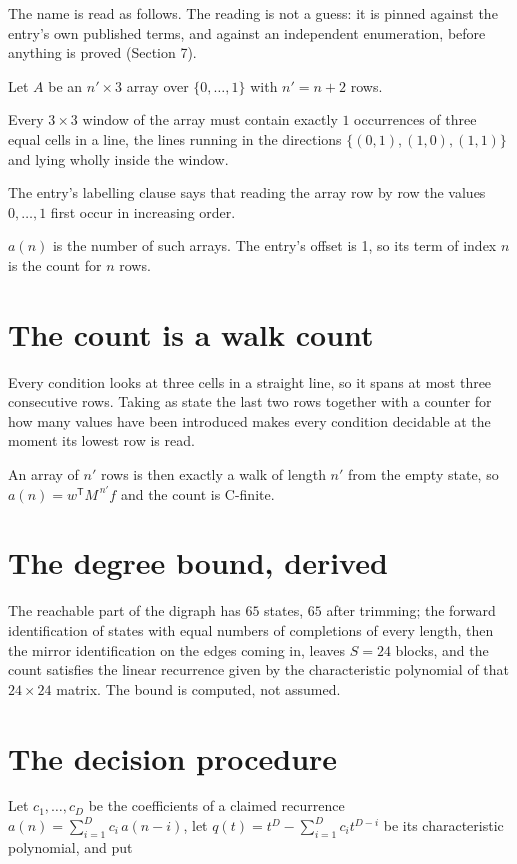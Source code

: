 \documentclass[11pt]{article}
\theoremstyle{definition}
\begin{document}
The name is read as follows. The reading is not a guess: it is pinned against the entry's own published terms, and against an independent enumeration, before anything is proved (Section 7).

Let $A$ be an $n' \times 3$ array over $\{0,\dots,1\}$ with $n' = n + 2$ rows.

Every $3\times3$ window of the array must contain exactly $1$ occurrences of three equal cells in a line, the lines running in the directions $\{(0,1), (1,0), (1,1)\}$ and lying wholly inside the window.

The entry's labelling clause says that reading the array row by row the values $0,\dots,1$ first occur in increasing order.

$a(n)$ is the number of such arrays. The entry's offset is 1, so its term of index $n$ is the count for $n$ rows.

\section{The count is a walk count}

Every condition looks at three cells in a straight line, so it spans at most three consecutive rows. Taking as state the last two rows together with a counter for how many values have been introduced makes every condition decidable at the moment its lowest row is read.

An array of $n'$ rows is then exactly a walk of length $n'$ from the empty state, so $a(n) = w^{\mathsf T}M^{\,n'}f$ and the count is C-finite.

\section{The degree bound, derived}

The reachable part of the digraph has $65$ states, $65$ after trimming; the forward identification of states with equal numbers of completions of every length, then the mirror identification on the edges coming in, leaves $S = 24$ blocks, and the count satisfies the linear recurrence given by the characteristic polynomial of that $24\times24$ matrix. The bound is computed, not assumed.

\section{The decision procedure}

Let $c_1,\dots,c_D$ be the coefficients of a claimed recurrence $a(n) = \sum_{i=1}^{D} c_i\,a(n-i)$, let $q(t) = t^{D} - \sum_{i=1}^{D} c_i t^{D-i}$ be its characteristic polynomial, and put
\end{document}
